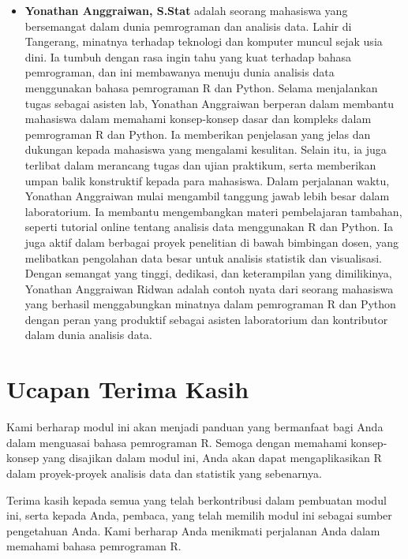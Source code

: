 \documentclass[
]{book}
\providecommand{\tightlist}{%
  \setlength{\itemsep}{0pt}\setlength{\parskip}{0pt}}
\begin{document}
\begin{itemize}
\tightlist
\item
  \textbf{Yonathan Anggraiwan, S.Stat} adalah seorang mahasiswa yang bersemangat dalam dunia pemrograman dan analisis data. Lahir di Tangerang, minatnya terhadap teknologi dan komputer muncul sejak usia dini. Ia tumbuh dengan rasa ingin tahu yang kuat terhadap bahasa pemrograman, dan ini membawanya menuju dunia analisis data menggunakan bahasa pemrograman R dan Python. Selama menjalankan tugas sebagai asisten lab, Yonathan Anggraiwan berperan dalam membantu mahasiswa dalam memahami konsep-konsep dasar dan kompleks dalam pemrograman R dan Python. Ia memberikan penjelasan yang jelas dan dukungan kepada mahasiswa yang mengalami kesulitan. Selain itu, ia juga terlibat dalam merancang tugas dan ujian praktikum, serta memberikan umpan balik konstruktif kepada para mahasiswa. Dalam perjalanan waktu, Yonathan Anggraiwan mulai mengambil tanggung jawab lebih besar dalam laboratorium. Ia membantu mengembangkan materi pembelajaran tambahan, seperti tutorial online tentang analisis data menggunakan R dan Python. Ia juga aktif dalam berbagai proyek penelitian di bawah bimbingan dosen, yang melibatkan pengolahan data besar untuk analisis statistik dan visualisasi. Dengan semangat yang tinggi, dedikasi, dan keterampilan yang dimilikinya, Yonathan Anggraiwan Ridwan adalah contoh nyata dari seorang mahasiswa yang berhasil menggabungkan minatnya dalam pemrograman R dan Python dengan peran yang produktif sebagai asisten laboratorium dan kontributor dalam dunia analisis data.
\end{itemize}

\hypertarget{ucapan-terima-kasih}{%
\section*{Ucapan Terima Kasih}\label{ucapan-terima-kasih}}

Kami berharap modul ini akan menjadi panduan yang bermanfaat bagi Anda dalam menguasai bahasa pemrograman R. Semoga dengan memahami konsep-konsep yang disajikan dalam modul ini, Anda akan dapat mengaplikasikan R dalam proyek-proyek analisis data dan statistik yang sebenarnya.

Terima kasih kepada semua yang telah berkontribusi dalam pembuatan modul ini, serta kepada Anda, pembaca, yang telah memilih modul ini sebagai sumber pengetahuan Anda. Kami berharap Anda menikmati perjalanan Anda dalam memahami bahasa pemrograman R.
\end{document}
